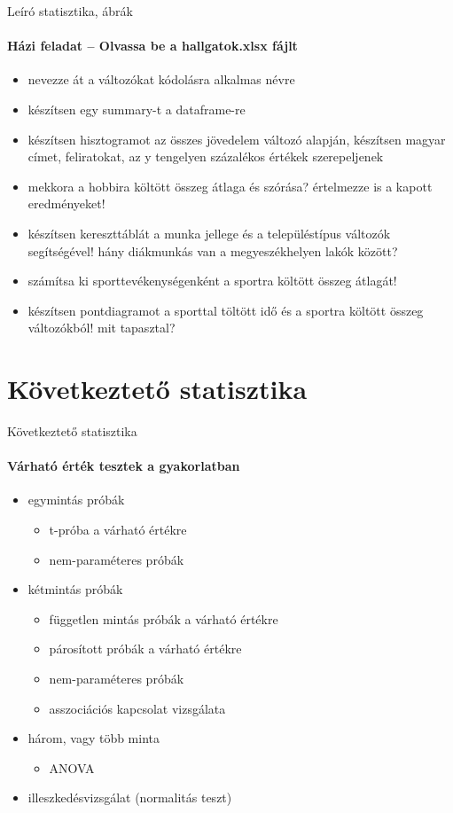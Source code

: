 \documentclass[10pt]{beamer}
\begin{document}
\begin{frame}{Leíró statisztika, ábrák}
\framesubtitle{Házi feladat -- Olvassa be a hallgatok.xlsx fájlt}
\begin{itemize}
\item nevezze át a változókat kódolásra alkalmas névre
\item készítsen egy summary-t a dataframe-re
\item készítsen hisztogramot az összes jövedelem változó alapján, készítsen magyar címet, feliratokat, az y tengelyen százalékos értékek szerepeljenek
\item mekkora a hobbira költött összeg átlaga és szórása? értelmezze is a kapott eredményeket!
\item készítsen kereszttáblát a munka jellege és a településtípus változók segítségével! hány diákmunkás van a megyeszékhelyen lakók között?
\item számítsa ki sporttevékenységenként a sportra költött összeg átlagát!
\item készítsen pontdiagramot a sporttal töltött idő és a sportra költött összeg változókból! mit tapasztal?
\end{itemize}
\end{frame}

\section{Következtető statisztika}

\begin{frame}{Következtető statisztika}
\framesubtitle{Várható érték tesztek a gyakorlatban}
\begin{itemize}
\item egymintás próbák
\begin{itemize}
\item t-próba a várható értékre
\item nem-paraméteres próbák
\end{itemize}
\item  kétmintás próbák
\begin{itemize}
\item független mintás próbák a várható értékre
\item párosított próbák a várható értékre
\item nem-paraméteres próbák
\item asszociációs kapcsolat vizsgálata
\end{itemize}
\item három, vagy több minta
\begin{itemize}
\item  ANOVA
\end{itemize}
\item illeszkedésvizsgálat (normalitás teszt)
\end{itemize}
\end{frame}
\end{document}
